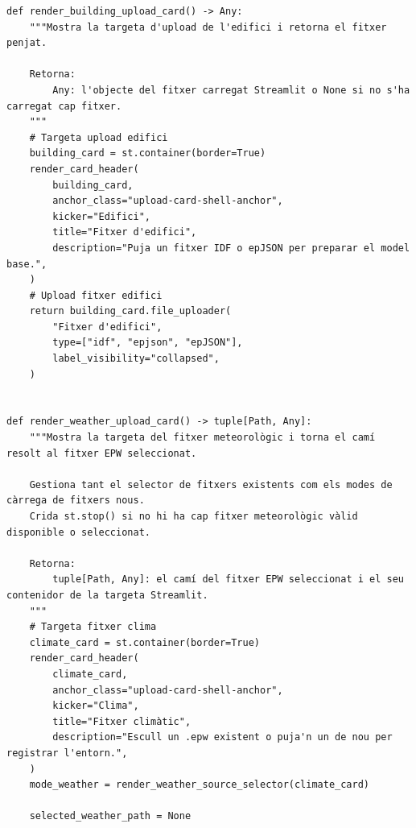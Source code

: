 \documentclass[10pt,a4paper]{article}
\begin{document}
\begin{lstlisting}[style=studioPython,caption={pages/Afegir\_Entorn.py},label={lst:pages-afegir-entorn-py}]
def render_building_upload_card() -> Any:
    """Mostra la targeta d'upload de l'edifici i retorna el fitxer penjat.

    Retorna:
        Any: l'objecte del fitxer carregat Streamlit o None si no s'ha carregat cap fitxer.
    """
    # Targeta upload edifici
    building_card = st.container(border=True)
    render_card_header(
        building_card,
        anchor_class="upload-card-shell-anchor",
        kicker="Edifici",
        title="Fitxer d'edifici",
        description="Puja un fitxer IDF o epJSON per preparar el model base.",
    )
    # Upload fitxer edifici
    return building_card.file_uploader(
        "Fitxer d'edifici",
        type=["idf", "epjson", "epJSON"],
        label_visibility="collapsed",
    )


def render_weather_upload_card() -> tuple[Path, Any]:
    """Mostra la targeta del fitxer meteorològic i torna el camí resolt al fitxer EPW seleccionat.

    Gestiona tant el selector de fitxers existents com els modes de càrrega de fitxers nous.
    Crida st.stop() si no hi ha cap fitxer meteorològic vàlid disponible o seleccionat.

    Retorna:
        tuple[Path, Any]: el camí del fitxer EPW seleccionat i el seu contenidor de la targeta Streamlit.
    """
    # Targeta fitxer clima
    climate_card = st.container(border=True)
    render_card_header(
        climate_card,
        anchor_class="upload-card-shell-anchor",
        kicker="Clima",
        title="Fitxer climàtic",
        description="Escull un .epw existent o puja'n un de nou per registrar l'entorn.",
    )
    mode_weather = render_weather_source_selector(climate_card)

    selected_weather_path = None


\end{lstlisting}
\end{document}
